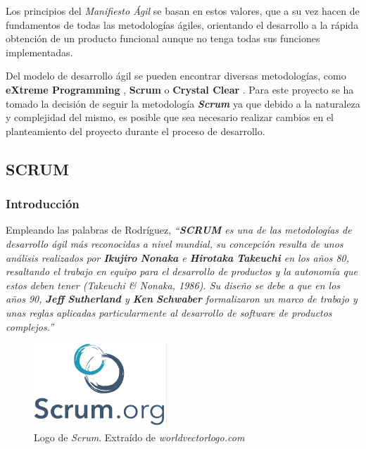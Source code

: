 Los principios del \textit{Manifiesto Ágil} se basan en estos valores, que a su vez hacen de fundamentos de 
todas las metodologías ágiles, orientando el desarrollo a la rápida obtención de un producto funcional 
aunque no tenga todas sus funciones implementadas. \medskip

Del modelo de desarrollo ágil se pueden encontrar diversas metodologías, como \textbf{eXtreme Programming} \autocite*{Stephens2003},
\textbf{Scrum} \autocite*{Schwaber2011} o \textbf{Crystal Clear} \autocite*{Cockburn2004}. 
Para este proyecto se ha tomado la decisión de seguir la metodología \textit{\textbf{Scrum}} ya que debido a la naturaleza y complejidad del mismo, 
es posible que sea necesario realizar cambios en el planteamiento del proyecto durante el proceso de desarrollo. \medskip

\subsection{SCRUM}
\subsubsection{Introducción}
Empleando las palabras de Rodríguez, \textit{“\textbf{SCRUM} es una de las metodologías de desarrollo ágil más reconocidas a nivel mundial, su concepción resulta de unos 
análisis realizados por \textbf{Ikujiro} \textbf{Nonaka} e \textbf{Hirotaka} \textbf{Takeuchi} en los años 80, resaltando el trabajo en equipo para el 
desarrollo de productos y la autonomía que estos deben tener (Takeuchi \& Nonaka, 1986). Su diseño se debe a que 
en los años 90, \textbf{Jeff} \textbf{Sutherland} y \textbf{Ken} \textbf{Schwaber} formalizaron un marco de trabajo y unas reglas aplicadas 
particularmente al desarrollo de software de productos complejos.”} \autocite*{Rodriguez} \medskip 

\begin{figure}[H]
    \centering
    \includegraphics[width=5cm]{Images/Logo_Scrum.jpeg}
    \caption{Logo de \textit{Scrum}. Extraído de \textit{worldvectorlogo.com} \autocite*{ScrumLogo}}
\end{figure}


